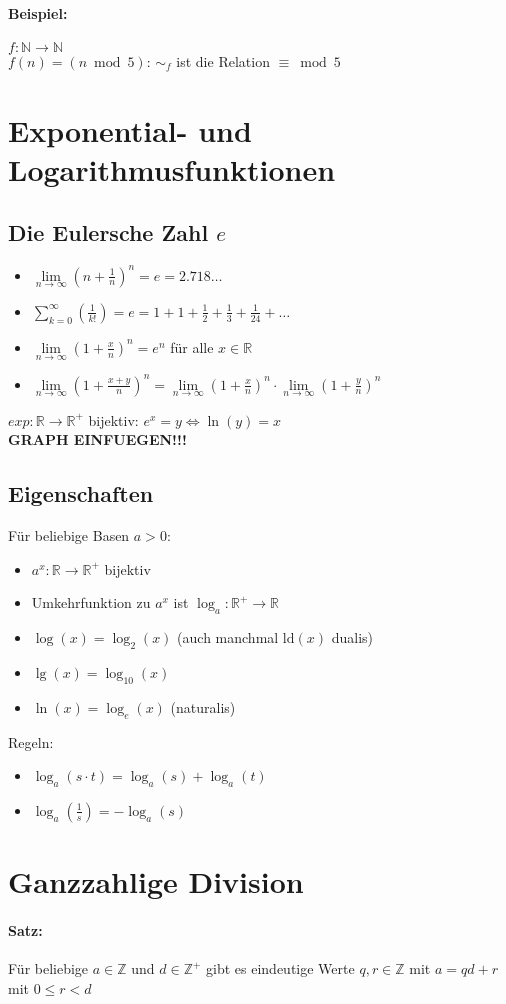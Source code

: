 \documentclass[10pt,a4paper]{article}
\begin{document}
\paragraph{Beispiel:}$f:\mathbb{N}\rightarrow\mathbb{N}$\\
$f(n)=(n \bmod 5)$: $\sim_f$ ist die Relation $\equiv \bmod 5$

\section{Exponential- und Logarithmusfunktionen}
\subsection{Die Eulersche Zahl $e$}
\begin{itemize}
\item $\lim\limits_{n \to \infty}\left(n+\frac{1}{n}\right)^n=e=2.718\ldots$
\item $\sum\limits_{k=0}^{\infty}\left(\frac{1}{k!}\right)=e=1+1+\frac{1}{2}+\frac{1}{3}+\frac{1}{24}+\ldots$
\item $\lim\limits_{n\to\infty}\left(1+\frac{x}{n}\right)^n=e^n$ für alle $x\in\mathbb{R}$
\item $\lim\limits_{n\to\infty}\left(1+\frac{x+y}{n}\right)^n=\lim\limits_{n\to\infty}\left(1+\frac{x}{n}\right)^n \cdot \lim\limits_{n\to\infty}\left(1+\frac{y}{n}\right)^n$
\end{itemize}
$exp: \mathbb{R}\to	\mathbb{R}^+$ bijektiv:
$e^x=y \Leftrightarrow \ln(y)=x$\\
\textbf{GRAPH EINFUEGEN!!!}

\subsection{Eigenschaften}
Für beliebige Basen $a>0$:
\begin{itemize}
\item $a^x:\mathbb{R}\to\mathbb{R}^+$ bijektiv
\item Umkehrfunktion zu $a^x$ ist $\log_a:\mathbb{R}^+\to\mathbb{R}$
\item $\log(x)=\log_2(x)$ (auch manchmal $\text{ld}(x)$ \glq dualis\grq )
\item $\lg(x)=\log_{10}(x)$
\item $\ln(x)=\log_e(x)$ (\glq naturalis\grq )
\end{itemize}
Regeln:
\begin{itemize}
\item $\log_a(s\cdot t) = \log_a(s) + \log_a(t)$
\item $\log_a\left(\frac{1}{s}\right)=-\log_a(s)$
\end{itemize}

\section{Ganzzahlige Division}
\paragraph{Satz:}Für beliebige $a\in\mathbb{Z}$ und $d\in\mathbb{Z}^+$ gibt es eindeutige Werte $q,r\in\mathbb{Z}$ mit $a=qd+r$ mit $0\leq r<d$
\end{document}
